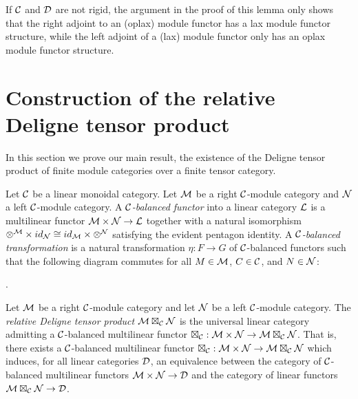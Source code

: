 \documentclass{amsart}
\begin{document}
\begin{remark}
If $\mathcal C$ and $\mathcal D$ are not rigid, the argument in the proof of this lemma only shows that the right adjoint to an (oplax) module functor has a lax module functor structure, while the left adjoint of a (lax) module functor only has an oplax module functor structure.  %
\end{remark}




\section{Construction of the relative Deligne tensor product} \label{sec:tc-deligne}

In this section we prove our main result, the existence of the Deligne tensor product of finite module categories over a finite tensor category.


\begin{definition}
	Let $\mathcal C$ be a linear monoidal category. 
	Let $\mathcal M$ be a right $\mathcal C$-module category and $\mathcal N$ a left $\mathcal C$-module category. A {\em $\mathcal C$-balanced functor} into a linear category $\mathcal L$ is a multilinear functor $\mathcal M \times \mathcal N \to \mathcal L$ together with a natural isomorphism $\otimes^{\mathcal M} \times id_{\mathcal N} \cong id_{\mathcal M} \times \otimes^{\mathcal N}$ satisfying the evident pentagon identity. A {\em $\mathcal C$-balanced transformation} is a natural transformation $\eta:F \to G$ of $\mathcal C$-balanced functors such that the following diagram commutes for all $M \in \mathcal M$, $C \in \mathcal C$, and $N \in \mathcal N$:
\begin{center}
.
\end{center}
\end{definition}


\begin{definition}
	Let $\mathcal M$ be a right $\mathcal C$-module category and let $\mathcal N$ be a left $\mathcal C$-module category. The {\em relative Deligne tensor product $\mathcal M \boxtimes_{\mathcal C} \mathcal N$} is the universal linear category admitting a $\mathcal C$-balanced multilinear functor $\boxtimes_{\mathcal C}: \mathcal M \times \mathcal N \to \mathcal M \boxtimes_{\mathcal C} \mathcal N$. That is, there exists a $\mathcal C$-balanced multilinear functor $\boxtimes_{\mathcal C}: \mathcal M \times \mathcal N \to \mathcal M \boxtimes_{\mathcal C} \mathcal N$ which induces, for all linear categories $\mathcal D$, an equivalence between the category of $\mathcal C$-balanced multilinear functors $\mathcal M \times \mathcal N \to \mathcal D$ and the category of linear functors $\mathcal M \boxtimes_{\mathcal C} \mathcal N \to \mathcal D$. 
\end{definition}
\end{document}
